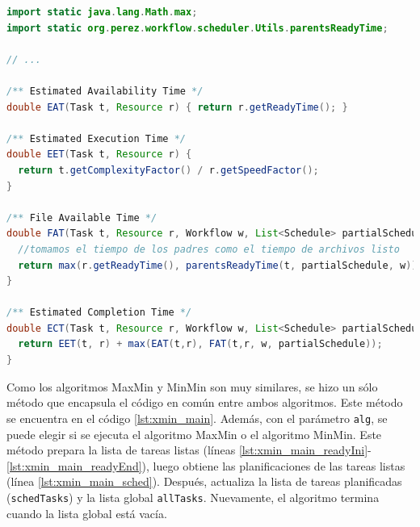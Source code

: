 \begin{lstlisting}[language=java,label={code:xmin_defs},caption={Definiciones comunes para MaxMin y MinMin.},float]
import static java.lang.Math.max; 
import static org.perez.workflow.scheduler.Utils.parentsReadyTime;

// ...

/** Estimated Availability Time */
double EAT(Task t, Resource r) { return r.getReadyTime(); }

/** Estimated Execution Time */
double EET(Task t, Resource r) { 
  return t.getComplexityFactor() / r.getSpeedFactor(); 
}

/** File Available Time */
double FAT(Task t, Resource r, Workflow w, List<Schedule> partialSchedule) {
  //tomamos el tiempo de los padres como el tiempo de archivos listo
  return max(r.getReadyTime(), parentsReadyTime(t, partialSchedule, w));
}

/** Estimated Completion Time */
double ECT(Task t, Resource r, Workflow w, List<Schedule> partialSchedule) {
  return EET(t, r) + max(EAT(t,r), FAT(t,r, w, partialSchedule));
}
\end{lstlisting}

Como los algoritmos MaxMin y MinMin son muy similares, se hizo un sólo método que encapsula el código en común entre ambos algoritmos. Este método se encuentra en el código \ref{lst:xmin_main}. Además, con el parámetro \texttt{alg}, se puede elegir si se ejecuta el algoritmo MaxMin o el algoritmo MinMin. Este método prepara la lista de tareas listas (líneas \ref{lst:xmin_main_readyIni}-\ref{lst:xmin_main_readyEnd}), luego obtiene las planificaciones de las tareas listas (línea \ref{lst:xmin_main_sched}). Después, actualiza la lista de tareas planificadas (\texttt{schedTasks}) y la lista global \texttt{allTasks}. Nuevamente, el algoritmo termina cuando la lista global está vacía.

